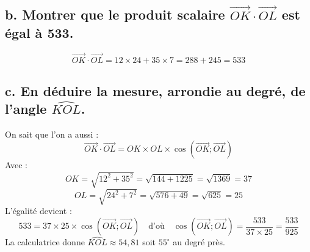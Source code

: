 \documentclass[10pt]{article}
\begin{document}
	\subsection*{b. Montrer que le produit scalaire $\overrightarrow{OK} \cdot \overrightarrow{OL}$ est égal à 533.}
	
	\[
	\overrightarrow{OK} \cdot \overrightarrow{OL} = 12 \times 24 + 35 \times 7 = 288 + 245 = 533
	\]
	
	\subsection*{c. En déduire la mesure, arrondie au degré, de l’angle $\widehat{KOL}$.}
On sait que l’on a aussi :
	\[
	\overrightarrow{OK} \cdot \overrightarrow{OL} = OK \times OL \times \cos(\overrightarrow{OK}; \overrightarrow{OL})
	\]
Avec :
	\[
	OK = \sqrt{12^2 + 35^2} = \sqrt{144 + 1225} = \sqrt{1369} = 37
	\]
	\[
	OL = \sqrt{24^2 + 7^2} = \sqrt{576 + 49} = \sqrt{625} = 25
	\]
L’égalité devient :
	\[
	533 = 37 \times 25 \times \cos(\overrightarrow{OK}; \overrightarrow{OL}) \quad \text{d’où} \quad \cos(\overrightarrow{OK}; \overrightarrow{OL}) = \dfrac{533}{37 \times 25} = \dfrac{533}{925}
	\]
La calculatrice donne $\widehat{KOL} \approx 54,81$ soit $55^\circ$ au degré près.
\end{document}
